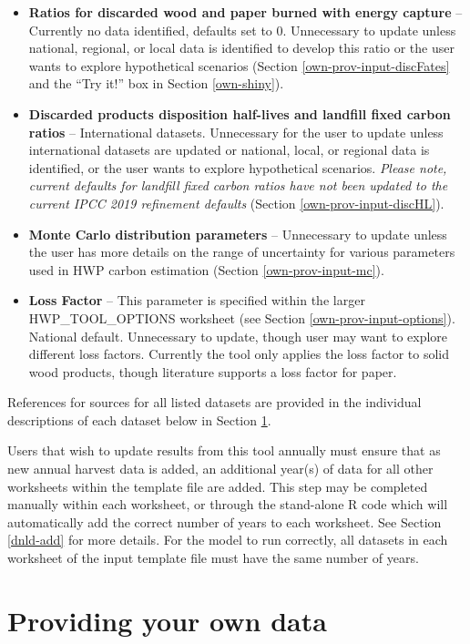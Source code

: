 \documentclass[
  openany]{book}
\begin{document}
\begin{itemize}
\item
  \textbf{Ratios for discarded wood and paper burned with energy capture} -- Currently no data identified, defaults set to 0. Unnecessary to update unless national, regional, or local data is identified to develop this ratio or the user wants to explore hypothetical scenarios (Section \ref{own-prov-input-discFates} and the ``Try it!'' box in Section \ref{own-shiny}).
\item
  \textbf{Discarded products disposition half-lives and landfill fixed carbon ratios} -- International datasets. Unnecessary for the user to update unless international datasets are updated or national, local, or regional data is identified, or the user wants to explore hypothetical scenarios. \emph{Please note, current defaults for landfill fixed carbon ratios have not been updated to the current IPCC 2019 refinement defaults} (Section \ref{own-prov-input-discHL}).
\item
  \textbf{Monte Carlo distribution parameters} -- Unnecessary to update unless the user has more details on the range of uncertainty for various parameters used in HWP carbon estimation (Section \ref{own-prov-input-mc}).
\item
  \textbf{Loss Factor} -- This parameter is specified within the larger HWP\_TOOL\_OPTIONS worksheet (see Section \ref{own-prov-input-options}). National default. Unnecessary to update, though user may want to explore different loss factors. Currently the tool only applies the loss factor to solid wood products, though literature supports a loss factor for paper.
\end{itemize}

References for sources for all listed datasets are provided in the individual descriptions of each dataset below in Section \ref{own-prov}.

Users that wish to update results from this tool annually must ensure that as new annual harvest data is added, an additional year(s) of data for all other worksheets within the template file are added. This step may be completed manually within each worksheet, or through the stand-alone R code which will automatically add the correct number of years to each worksheet. See Section \ref{dnld-add} for more details. For the model to run correctly, all datasets in each worksheet of the input template file must have the same number of years.

\hypertarget{own-prov}{%
\section{Providing your own data}\label{own-prov}}
\end{document}
